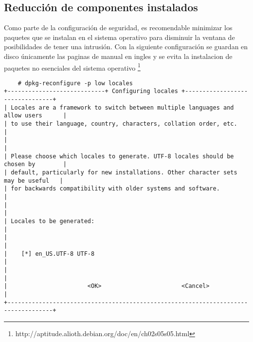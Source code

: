       \subsection {Reducci\'{o}n de componentes instalados}

Como parte de la configuraci\'{o}n de seguridad, es recomendable minimizar los paquetes que se instalan en el sistema operativo para disminuir la ventana de posibilidades de tener una intrusi\'{o}n. Con la siguiente configuraci\'{o}n se guardan en disco \'{u}nicamente las paginas de manual en ingles y se evita la instalacion de paquetes no esenciales del sistema operativo \footnote{http://aptitude.alioth.debian.org/doc/en/ch02s05s05.html}

{
\scriptsize
\linespread{1}
\begin{verbatim}
    # dpkg-reconfigure -p low locales
+----------------------------+ Configuring locales +--------------------------------+
| Locales are a framework to switch between multiple languages and allow users      |
| to use their language, country, characters, collation order, etc.                 |
|                                                                                   |
| Please choose which locales to generate. UTF-8 locales should be chosen by        |
| default, particularly for new installations. Other character sets may be useful   |
| for backwards compatibility with older systems and software.                      |
|                                                                                   |
| Locales to be generated:                                                          |
|                                                                                   |
|    [*] en_US.UTF-8 UTF-8                                                          |
|                                                                                   |
|                       <OK>                       <Cancel>                         |
+-----------------------------------------------------------------------------------+
\end{verbatim}
}

